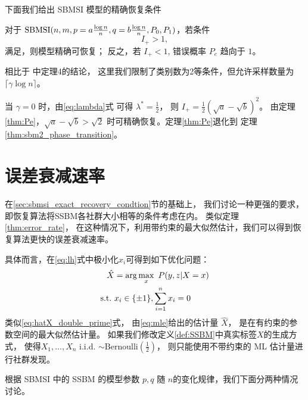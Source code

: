 下面我们给出 SBMSI 模型的精确恢复条件
	
\begin{theorem}\label{thm:Pe}
    对于 $\operatorname{SBMSI}(n,m,p=a\frac{\log n}{n},q=b\frac{\log n}{n},P_0,P_1)$，若条件
    \begin{equation}\label{eq:positive_condition}
        I_+ > 1,
    \end{equation}
    满足，则模型精确可恢复；
    反之，若 $I_+ < 1$,  错误概率 $P_e$ 趋向于 $1$。
\end{theorem}
相比于 \citet{abbe17sideinfo} 中定理4的结论，
这里我们限制了类别数为2等条件，但允许采样数量为
$\lceil \gamma \log n \rceil $。

当 $\gamma=0$ 时，由\eqref{eq:lambda}式 可得 $\lambda^*=\frac{1}{2}$，
则 $I_+=\frac{1}{2}(\sqrt{a}-\sqrt{b})^2$。
由定理\ref{thm:Pe}，$\sqrt{a}-\sqrt{b} > \sqrt{2}$
时可精确恢复。定理\ref{thm:Pe}退化到
定理\ref{thm:sbm2_phase_transition}。


\section{误差衰减速率}
在\ref{sec:sbmsi_exact_recovery_condtion}节的基础上，
我们讨论一种更强的要求，即恢复算法将SSBM各社群大小相等的条件考虑在内。
类似定理\ref{thm:error_rate}，
在这种情况下，利用带约束的最大似然估计，我们可以得到恢复算法更快的误差衰减速率。

具体而言，在\eqref{eq:lh}式中极小化$x_i$可得到如下优化问题：
\begin{align}
    \hat{X} &= \arg\max_x\ P(y,z|X=x) \notag \\
    \textrm{s.t.} \ & x_i \in \{\pm 1\}, \sum_{i=1}^n x_i=0 \label{eq:mle}
\end{align}
类似\eqref{eq:hatX_double_prime}式，
由\eqref{eq:mle}给出的估计量 $\hat{X}$，
是在有约束的参数空间的最大似然估计量。
如果我们修改定义\ref{def:SSBM}中真实标签$X$的生成方式，
使得$X_1, \dots, X_n$ i.i.d. $\sim \textrm{Bernoulli}(\frac{1}{2})$，
则只能使用不带约束的 ML 估计量进行社群发现。

根据 SBMSI 中的 SSBM 的模型参数 $p,q$ 随 $n$的变化规律，我们下面分两种情况讨论。
